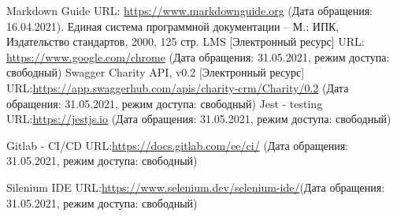 \documentclass[a4paper,12pt,reqno]{article}
\begin{document}
	\newpage
	\begin{thebibliography}{3}
	     Markdown Guide URL: \url{https://www.markdownguide.org} (Дата обращения: 16.04.2021).
	    Единая система программной документации – М.: ИПК, Издательство стандартов, 2000, 125 стр.
		LMS [Электронный ресурс] URL: 
		\url{https://www.google.com/chrome} (Дата обращения: 31.05.2021, режим доступа: свободный)
		 Swagger Charity API, v0.2 [Электронный ресурс]  URL:\url{https://app.swaggerhub.com/apis/charity-crm/Charity/0.2} (Дата обращения: 31.05.2021, режим доступа: свободный)
		 Jest - testing URL:\url{https://jestjs.io} (Дата обращения: 31.05.2021, режим доступа: свободный)
		
		 Gitlab - CI/CD URL:\url{https://docs.gitlab.com/ee/ci/} (Дата обращения: 31.05.2021, режим доступа: свободный)
		
		 Silenium IDE URL:\url{https://www.selenium.dev/selenium-ide/}(Дата обращения: 31.05.2021, режим доступа: свободный)
	\end{thebibliography}
	
	\newpage
	
	
	
\end{document}

